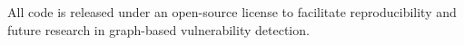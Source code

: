 All code is released under an open-source license to facilitate reproducibility and future research in graph-based vulnerability detection.

\printbibliography




